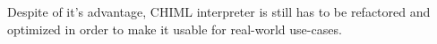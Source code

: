 \documentclass[conference]{IEEEtran}
\begin{document}
Despite of it's advantage, CHIML interpreter is still has to be refactored and optimized in order to make it usable for real-world use-cases.




\ifCLASSOPTIONcaptionsoff
  \newpage
\fi




\end{document}
